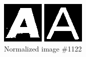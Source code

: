 \documentclass{article}
\begin{document}
\begin{figure}[!htb]
  \includegraphics[width=\linewidth]{1122/processed.png}
  \caption{Normalized image \#1122}\label{fig:awesome_image1}
\endminipage\hfill
{}
  \includegraphics[width=\linewidth]{1653/processed.png}

\end{figure}
\end{document}
